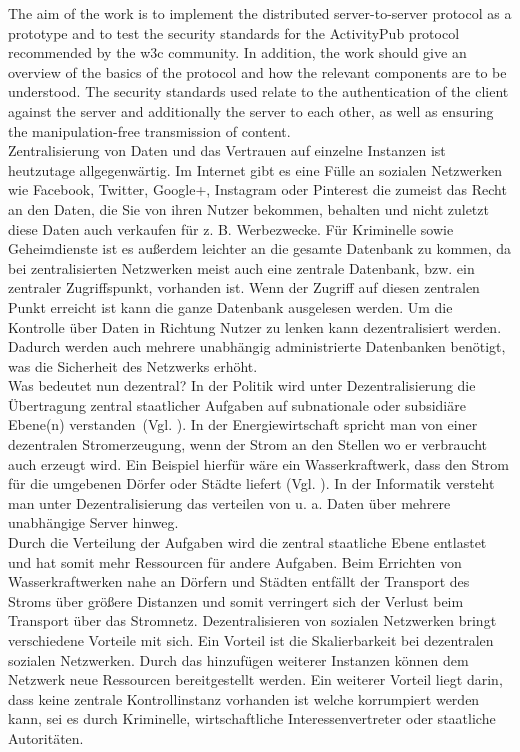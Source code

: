 {	%
	The aim of the work is to implement the distributed server-to-server protocol as a prototype and to test the security standards for the ActivityPub protocol recommended by the \gls{w3c} community. In addition, the work should give an overview of the basics of the protocol and how the relevant components are to be understood. The security standards used relate to the authentication of the client against the server and additionally the server to each other, as well as ensuring the manipulation-free transmission of content.\\

}{
	Zentralisierung von Daten und das Vertrauen auf einzelne Instanzen ist heutzutage allgegenwärtig. Im Internet gibt es eine Fülle an sozialen Netzwerken wie Facebook, Twitter, Google+, Instagram oder Pinterest die zumeist das Recht an den Daten, die Sie von ihren Nutzer bekommen, behalten und nicht zuletzt diese Daten auch verkaufen für z. B. Werbezwecke. Für Kriminelle sowie Geheimdienste ist es außerdem leichter an die gesamte Datenbank zu kommen, da bei zentralisierten Netzwerken meist auch eine zentrale Datenbank, bzw. ein zentraler Zugriffspunkt, vorhanden ist. Wenn der Zugriff auf diesen zentralen Punkt erreicht ist kann die ganze Datenbank ausgelesen werden. Um die Kontrolle über Daten in Richtung Nutzer zu lenken kann dezentralisiert werden. Dadurch werden auch mehrere unabhängig administrierte Datenbanken benötigt, was die Sicherheit des Netzwerks erhöht.\\
	
	Was bedeutet nun dezentral? In der Politik wird unter Dezentralisierung \glqq die Übertragung zentral staatlicher Aufgaben auf subnationale oder subsidiäre Ebene(n) verstanden\grqq~(Vgl. \cite{bpb-dezentralisierung}). In der Energiewirtschaft spricht man von einer \glqq dezentralen Stromerzeugung\grqq, wenn der Strom an den Stellen wo er verbraucht auch erzeugt wird. Ein Beispiel hierfür wäre ein Wasserkraftwerk, dass den Strom für die umgebenen Dörfer oder Städte liefert (Vgl. \cite{wikipedia-dezentralisierung-energie}). In der Informatik versteht man unter Dezentralisierung das verteilen von u. a. Daten über mehrere unabhängige Server hinweg.\\
	
	Durch die Verteilung der Aufgaben wird die zentral staatliche Ebene entlastet und hat somit mehr Ressourcen für andere Aufgaben. Beim Errichten von Wasserkraftwerken nahe an Dörfern und Städten entfällt der Transport des Stroms über größere Distanzen und somit verringert sich der Verlust beim Transport über das Stromnetz. Dezentralisieren von sozialen Netzwerken bringt verschiedene Vorteile mit sich. Ein Vorteil ist die Skalierbarkeit bei dezentralen sozialen Netzwerken. Durch das hinzufügen weiterer Instanzen können dem Netzwerk neue Ressourcen bereitgestellt werden. Ein weiterer Vorteil liegt darin, dass keine zentrale Kontrollinstanz vorhanden ist welche korrumpiert werden kann, sei es durch Kriminelle, wirtschaftliche Interessenvertreter oder staatliche Autoritäten.\\
	
}
